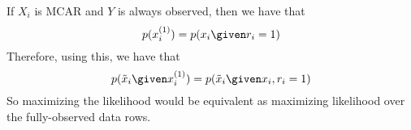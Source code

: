 If $X_i$ is MCAR and $Y$ is always observed, then we have that 
\begin{equation*}
    p(x_i^{(1)}) = p(x_i \given r_i = 1)
\end{equation*}
Therefore, using this, we have that
\begin{equation*}
    p(\Tilde{x}_i \given x_i^{(1)}) = p(\Tilde{x}_i \given x_i, r_i=1)
\end{equation*}
So maximizing the likelihood would be equivalent as maximizing likelihood over the fully-observed data rows.